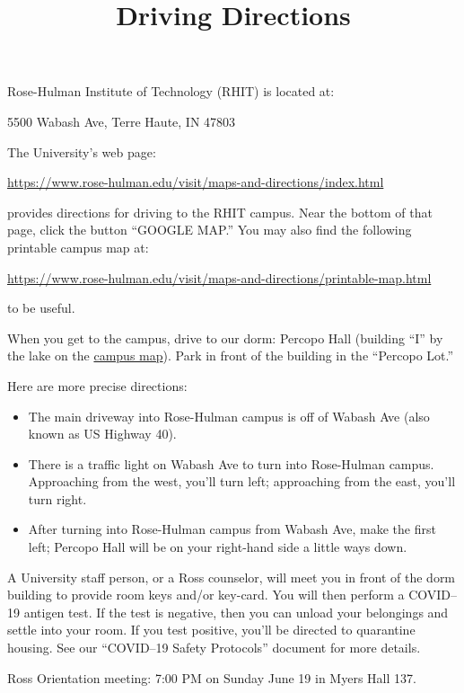 \documentclass{ross}
\title{Driving Directions}
\begin{document}
\maketitle

Rose-Hulman Institute of Technology (RHIT) is located at:
\begin{center}
    5500 Wabash Ave, Terre Haute, IN 47803
\end{center}

The University's web page:
\begin{center}
    \href{https://www.rose-hulman.edu/visit/maps-and-directions/index.html}{\ttfamily\color{blue} https://www.rose-hulman.edu/visit/maps-and-directions/index.html}
\end{center}
provides directions for driving to the RHIT campus.  Near the bottom of that page, click the button ``{\sffamily GOOGLE MAP}.'' You may also find the following printable campus map at:
\begin{center}
    \href{https://www.rose-hulman.edu/visit/maps-and-directions/printable-map.html}{\ttfamily\color{blue}https://www.rose-hulman.edu/visit/maps-and-directions/printable-map.html} 
\end{center}
to be useful. 

When you get to the campus, drive to our dorm: Percopo Hall (building ``I'' by the lake on the \href{https://www.rose-hulman.edu/visit/maps-and-directions/printable-map.html}{\color{blue}campus map}). Park in front of the building in the ``Percopo Lot.''  

Here are more precise directions:

\begin{itemize}
\item The main driveway into Rose-Hulman campus is off of Wabash Ave (also known as US Highway 40). 
\item There is a traffic light on Wabash Ave to turn into Rose-Hulman campus. Approaching from the west, you'll turn left; approaching from the east, you'll turn right. 
\item After turning into Rose-Hulman campus from Wabash Ave, make the first left; Percopo Hall will be on your right-hand side a little ways down.
\end{itemize}

A University staff person, or a Ross counselor, will meet you in front of the dorm building to provide room keys and/or key-card.  You will then perform a COVID--19 antigen test.  If the test is negative, then you can unload your belongings and settle into your room. If you test positive, you'll be directed to quarantine housing. See our ``COVID--19 Safety Protocols'' document for more details.

Ross Orientation meeting:  7:00 PM on Sunday June 19 in Myers Hall 137.
\end{document}
